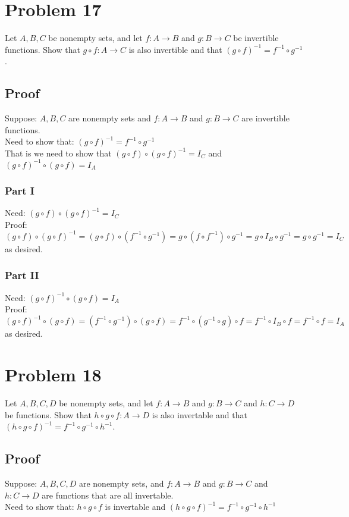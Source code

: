 \documentclass{article}
\begin{document}
\section*{Problem 17}
Let $A, B, C$ be nonempty sets, and let $f : A \rightarrow B$ and $g : B \rightarrow C$ be invertible functions.
Show that $g \circ f : A \rightarrow C$ is also invertible and that $(g \circ f)^{-1} = f^{-1} \circ g^{-1}$.
\subsection*{Proof}
Suppose: $A,B,C$ are nonempty sets and $f : A \rightarrow B$ and $g : B \rightarrow C$ are invertible functions. \\
Need to show that: $(g \circ f)^{-1} = f^{-1} \circ g^{-1}$\\
That is we need to show that $(g \circ f) \circ (g \circ f)^{-1} = I_C$ and $(g \circ f)^{-1} \circ (g \circ f) = I_A$\\
\subsubsection*{Part I}
Need: $(g \circ f) \circ (g \circ f)^{-1} = I_C$\\
Proof: $(g \circ f) \circ (g \circ f)^{-1} = (g \circ f) \circ (f^{-1} \circ g^{-1}) = g \circ (f \circ f^{-1}) \circ g^{-1} = g \circ I_B \circ g^{-1} = g \circ g^{-1} = I_C$ as desired.
\subsubsection*{Part II}
Need: $(g \circ f)^{-1} \circ (g \circ f) = I_A$\\
Proof: $(g \circ f)^{-1} \circ (g \circ f) = (f^{-1} \circ g^{-1}) \circ (g \circ f) = f^{-1} \circ (g^{-1} \circ g) \circ f = f^{-1} \circ I_B \circ f = f^{-1} \circ f = I_A$ as desired.

\section*{Problem 18}
Let $A, B, C, D$ be nonempty sets, and let $f : A \rightarrow B$ and $g : B \rightarrow C$ and $h : C \rightarrow D$ be functions. Show that $h \circ g \circ f : A \rightarrow D$ is also invertable and that $(h \circ g \circ f)^{-1} = f^{-1} \circ g^{-1} \circ h^{-1}$.
\subsection*{Proof}
Suppose: $A, B, C, D$ are nonempty sets, and $f : A \rightarrow B$ and $g : B \rightarrow C$ and $h : C \rightarrow D$ are functions that are all invertable. \\
Need to show that: $h \circ g \circ f$ is invertable and $(h \circ g \circ f)^{-1} = f^{-1} \circ g^{-1} \circ h^{-1}$\\
\end{document}
